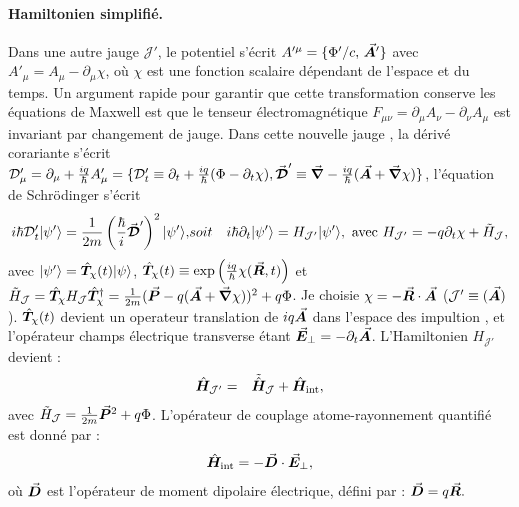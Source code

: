 \paragraph{Hamiltonien simplifié.}

Dans une autre jauge $\mathcal{J}'$, le potentiel s’écrit $A'^\mu = \{ \Phi'/c,\, \vec{{\bm{A}}}' \}$ avec $ A'_\mu = A_\mu - \partial_\mu \chi$, où $\chi$ est une fonction scalaire dépendant de l’espace et du temps. Un argument rapide pour garantir que cette transformation conserve les équations de Maxwell est que le tenseur électromagnétique
\(
F_{\mu\nu} = \partial_\mu A_\nu - \partial_\nu A_\mu
\)
est invariant par changement de jauge. Dans cette nouvelle jauge , la dérivé corariante s'écrit $\mathcal{D}_\mu' = \partial_\mu + \frac{iq}{\hbar} A_\mu' = \{ \mathcal{D}_t' \equiv \partial_t + \frac{iq}{\hbar} ( \Phi - \partial_t \chi )   , \vec{{\bm{\mathcal{D}}}}' \equiv \vec{{\bm{\nabla}}} - \frac{iq}{\hbar} (\vec{{\bm{A}}} + \vec{{\bm{\nabla}}}\chi)\} $, l’équation de Schrödinger s'écrit
\begin{eqnarray}
	i\hbar \mathcal{D}_t' \vert \psi' \rangle = \frac{1}{2m} \left( \frac{\hbar}{i} \operatorvec{\mathcal{D}}' \right)^2 \vert \psi' \rangle, & soit &  i\hbar \partial_t \vert \psi' \rangle = H_{\mathcal{J}'} \vert \psi' \rangle , ~\mbox{avec}~	H_{\mathcal{J}'} = -q\partial_t \chi + \tilde{H}_{\mathcal{J}},%
\end{eqnarray}
avec $\vert \psi'\rangle = \hat{\bm{T}}_\chi(t) \vert \psi\rangle$, $\hat{\bm{T}}_\chi(t) \equiv \exp\left( \frac{iq}{\hbar} \chi(\vec{{\bm{R}}}, t) \right)$ et $\tilde{H}_{\mathcal{J}} = \hat{\bm{T}}_\chi H_{\mathcal{J}}\hat{\bm{T}}_\chi^\dag = \frac{1}{2m} ( \vec{{\bm{P}}} - q  ( \vec{{\bm{A}}} + \vec{{\bm{\nabla}}}\chi  )  )^2 + q \Phi $. Je choisie $\chi = - \vec{{\bm{R}}}\cdot\vec{{\bm{A}}}$ (\ie $\mathcal{J}' \equiv (\vec{{\bm{A}}})$). $\hat{\bm{T}}_\chi(t)$ devient un operateur translation de $iq \vec{{\bm{A}}}$ dans l’espace des impultion , et l'opérateur champs électrique transverse étant $\vec{{\bm{E}}}_\perp = - \partial_t \vec{{\bm{A}}}$. L'Hamiltonien $H_{\mathcal{J}'}$ devient :
\begin{eqnarray}
	\hat{\bm{H}}_{\mathcal{J}'} & = & 	\tilde{\hat{\bm{H}}}_{\mathcal{J}}	+ \hat{\bm{H}}_{\text{int}},
\end{eqnarray}
avec $\tilde{H}_{\mathcal{J}} = \frac{1}{2m}\vec{{\bm{P}}}^2 +q \Phi$. L’opérateur de couplage atome-rayonnement quantifié est donné par :
\begin{eqnarray}
\hat{\bm{H}}_{\text{int}} = - \vec{{\bm{D}}} \cdot \vec{{\bm{E}}}_\perp,
\end{eqnarray}
où \(\vec{{\bm{D}}}\) est l’opérateur de moment dipolaire électrique, défini par :
\(
\vec{{\bm{D}}} = q \vec{{\bm{R}}}.
\)



